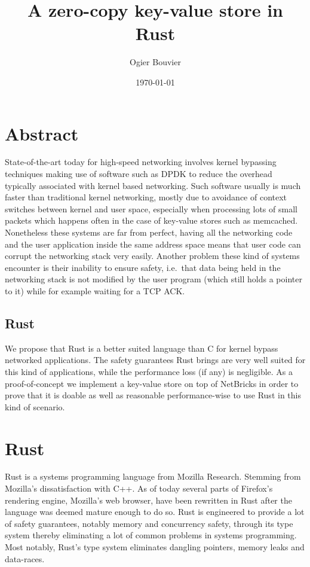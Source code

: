 \documentclass[11pt]{article}
\author{Ogier Bouvier}
\date{\today}
\title{A zero-copy key-value store in Rust}
\begin{document}
\maketitle
\tableofcontents
\newpage

\section{Abstract}
State-of-the-art today for high-speed networking involves kernel
bypassing techniques making use of software such as DPDK to reduce the
overhead typically associated with kernel based networking. Such
software usually is much faster than traditional kernel networking,
mostly due to avoidance of context switches between kernel and
user space, especially when processing lots of small packets which
happens often in the case of key-value stores such as memcached.
Nonetheless these systems are far from perfect, having all the
networking code and the user application inside the same address
space means that user code can corrupt the networking stack very
easily. Another problem these kind of systems encounter is their
inability to ensure safety, i.e.\ that data being held in the
networking stack is not modified by the user program (which still
holds a pointer to it) while for example waiting for a TCP ACK.

\subsection{Rust}
We propose that Rust is a better suited language than C for kernel
bypass networked applications. The safety guarantees Rust
brings are very well suited for this kind of applications, while the
performance loss (if any) is negligible. As a proof-of-concept we
implement a key-value store on top of NetBricks in order to prove that
it is doable as well as reasonable performance-wise to use Rust in
this kind of scenario.

\section{Rust}
Rust is a systems programming language from Mozilla Research. Stemming
from Mozilla's dissatisfaction with C++. As of today several parts of
Firefox's rendering engine, Mozilla's web browser, have been rewritten
in  Rust after the language was deemed mature enough to do so. Rust is
engineered to  provide a lot of safety guarantees, notably memory and
concurrency safety, through its type system thereby eliminating a lot
of common problems in systems programming. Most notably, Rust's type
system eliminates dangling pointers, memory leaks and data-races.
\end{document}
